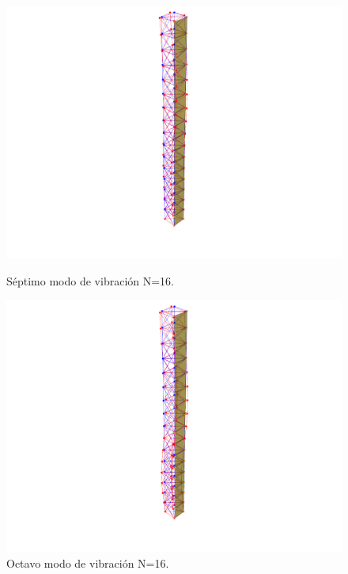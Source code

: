 \begin{figure}[H]
    \begin{minipage}[b]{0.5\textwidth}
        \centering
        \includegraphics[width=\textwidth]{FOTOS/mod7_16.png}
        \caption{Séptimo modo de vibración N=16.}
    \end{minipage}
    \hfill
    \begin{minipage}[b]{0.5\textwidth}
        \centering
        \includegraphics[width=\textwidth]{FOTOS/mod8_16.png}
        \caption{Octavo modo de vibración N=16.}
    \end{minipage}
\end{figure}

